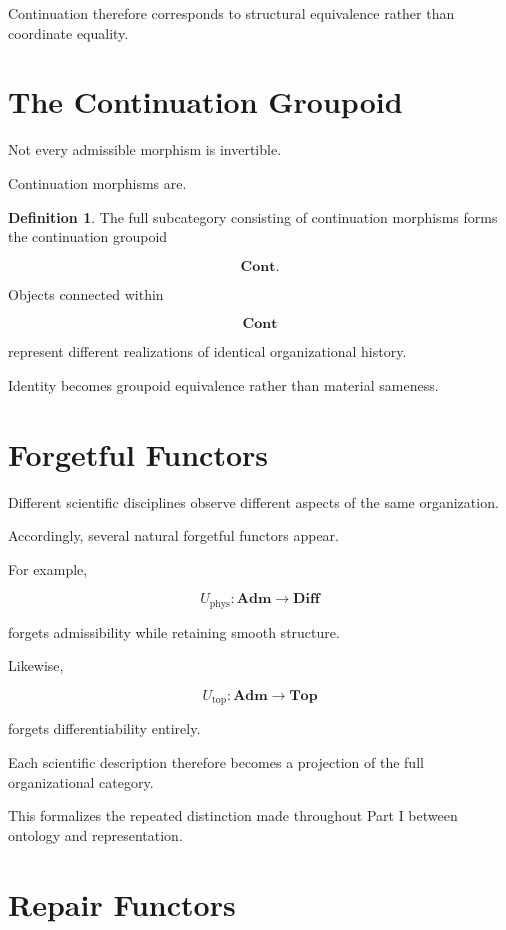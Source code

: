 \documentclass[11pt,oneside]{book}
\numberwithin{equation}{chapter}
\theoremstyle{definition}
\newtheorem{definition}{Definition}[chapter]
\theoremstyle{plain}
\begin{document}
Continuation therefore corresponds to structural equivalence rather than
coordinate equality.

\section{The Continuation Groupoid}

Not every admissible morphism is invertible.

Continuation morphisms are.

\begin{definition}

The full subcategory consisting of continuation morphisms forms the
continuation groupoid

\[
\mathbf{Cont}.
\]

\end{definition}

Objects connected within

\[
\mathbf{Cont}
\]

represent different realizations of identical organizational history.

Identity becomes groupoid equivalence rather than material sameness.

\section{Forgetful Functors}

Different scientific disciplines observe different aspects of the same
organization.

Accordingly, several natural forgetful functors appear.

For example,

\[
U_{\mathrm{phys}}
:
\mathbf{Adm}
\rightarrow
\mathbf{Diff}
\]

forgets admissibility while retaining smooth structure.

Likewise,

\[
U_{\mathrm{top}}
:
\mathbf{Adm}
\rightarrow
\mathbf{Top}
\]

forgets differentiability entirely.

Each scientific description therefore becomes a projection of the full
organizational category.

This formalizes the repeated distinction made throughout Part I between
ontology and representation.

\section{Repair Functors}
\end{document}
